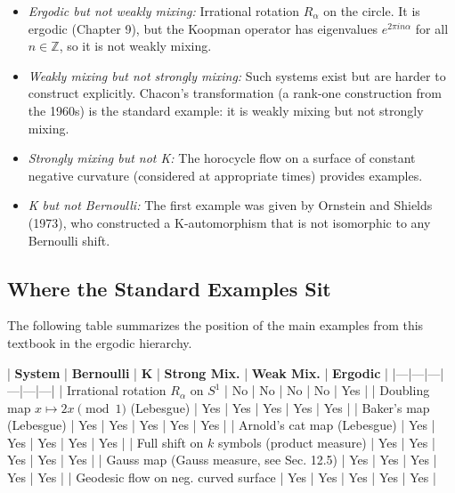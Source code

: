 \begin{itemize}[nosep]
  \item \textit{Ergodic but not weakly mixing:} Irrational rotation $R_\alpha$ on the circle. It is ergodic (Chapter 9), but the Koopman operator has eigenvalues $e^{2\pi i n \alpha}$ for all $n \in \mathbb{Z}$, so it is not weakly mixing.

  \item \textit{Weakly mixing but not strongly mixing:} Such systems exist but are harder to construct explicitly. Chacon's transformation (a rank-one construction from the 1960s) is the standard example: it is weakly mixing but not strongly mixing.

  \item \textit{Strongly mixing but not K:} The horocycle flow on a surface of constant negative curvature (considered at appropriate times) provides examples.

  \item \textit{K but not Bernoulli:} The first example was given by Ornstein and Shields (1973), who constructed a K-automorphism that is not isomorphic to any Bernoulli shift.
\end{itemize}


\subsection{Where the Standard Examples Sit}\label{sec:12.4.3}

The following table summarizes the position of the main examples from this textbook in the ergodic hierarchy.

| \textbf{System} | \textbf{Bernoulli} | \textbf{K} | \textbf{Strong Mix.} | \textbf{Weak Mix.} | \textbf{Ergodic} |
|---|---|---|---|---|---|
| Irrational rotation $R_\alpha$ on $S^1$ | No | No | No | No | Yes |
| Doubling map $x \mapsto 2x \pmod{1}$ (Lebesgue) | Yes | Yes | Yes | Yes | Yes |
| Baker's map (Lebesgue) | Yes | Yes | Yes | Yes | Yes |
| Arnold's cat map (Lebesgue) | Yes | Yes | Yes | Yes | Yes |
| Full shift on $k$ symbols (product measure) | Yes | Yes | Yes | Yes | Yes |
| Gauss map (Gauss measure, see Sec. 12.5) | Yes | Yes | Yes | Yes | Yes |
| Geodesic flow on neg. curved surface | Yes | Yes | Yes | Yes | Yes |

